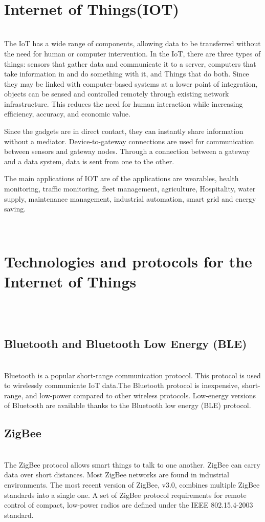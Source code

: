 \documentclass{article}
\begin{document}
\\

\section{Internet of Things(IOT)}
\\
The IoT has a wide range of components, allowing data to be transferred without the need for human or computer intervention. In the IoT, there are three types of things: sensors that gather data and communicate it to a server, computers that take information in and do something with it, and Things that do both. Since they may be linked with computer-based systems at a lower point of integration, objects can be sensed and controlled remotely through existing network infrastructure. This reduces the need for human interaction while increasing efficiency, accuracy, and economic value.

Since the gadgets are in direct contact, they can instantly share information without a mediator. Device-to-gateway connections are used for communication between sensors and gateway nodes. Through a connection between a gateway and a data system, data is sent from one to the other.

The main applications of IOT are of the applications are wearables, health monitoring,
traffic monitoring, fleet management, agriculture, Hospitality, water supply, maintenance management, industrial automation, smart grid and energy saving.

\\

\section{ Technologies and protocols for the Internet of Things}
\\
\\
\subsection{Bluetooth and Bluetooth Low Energy (BLE)}
\\
 Bluetooth is a popular short-range communication protocol. This protocol is used to wirelessly communicate IoT data.The Bluetooth protocol is inexpensive, short-range, and low-power compared to other wireless protocols. Low-energy versions of Bluetooth are available thanks to the Bluetooth low energy (BLE) protocol.
\\
\subsection{ZigBee}
\\
 The ZigBee protocol allows smart things to talk to one another. ZigBee can carry data over short  distances. Most ZigBee networks are found in industrial environments. The most recent version of ZigBee, v3.0, combines multiple ZigBee standards into a single one. A set of ZigBee protocol requirements for remote control of compact, low-power radios are defined under the IEEE 802.15.4-2003 standard. 
\\
\end{document}
